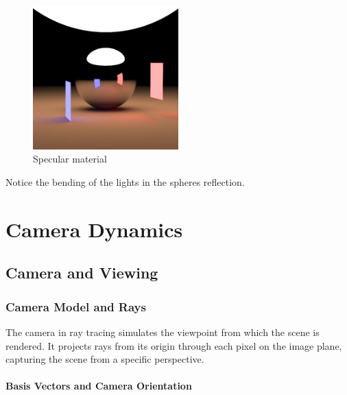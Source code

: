 \documentclass[12pt]{article}
\begin{document}
\begin{figure}[H]
    \centering
    \includegraphics[width=0.5\textwidth]{images/specular_sphere.png}
    \caption{Specular material}
    \label{fig:specmat}
\end{figure}

Notice the bending of the lights in the spheres reflection.
\section{Camera Dynamics}
\label{sec:camera}

\subsection{Camera and Viewing}
\label{subsec:camera-viewing}

\subsubsection{Camera Model and Rays}
The camera in ray tracing simulates the viewpoint from which the scene is rendered. It projects rays from its origin through each pixel on the image plane, capturing the scene from a specific perspective.

\paragraph{Basis Vectors and Camera Orientation}
\end{document}
